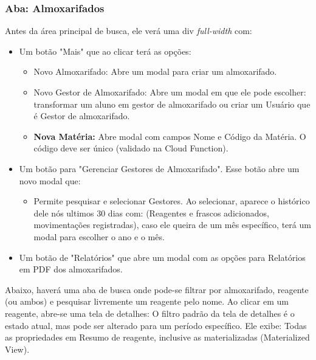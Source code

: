 \documentclass[12pt,a4paper]{article}
\begin{document}
\subsubsection{Aba: Almoxarifados}
Antes da área principal de busca, ele verá uma div \textit{full-width} com:
\begin{itemize}
    \item Um botão "Mais" que ao clicar terá as opções:
     \begin{itemize}
         \item Novo Almoxarifado: Abre um modal para criar um almoxarifado.
         \item Novo Gestor de Almoxarifado: Abre um modal em que ele pode escolher: transformar um aluno em gestor de almoxarifado ou criar um Usuário que é Gestor de almoxarifado.
         \item \textbf{Nova Matéria:} Abre modal com campos Nome e Código da Matéria. O código deve ser único (validado na Cloud Function).
     \end{itemize}
    \item Um botão para "Gerenciar Gestores de Almoxarifado". Esse botão abre um novo modal que:
    \begin{itemize}
        \item Permite pesquisar e selecionar Gestores. Ao selecionar, aparece o histórico dele nós ultimos 30 dias com: (Reagentes e frascos adicionados, movimentações registradas), caso ele queira de um mês específico, terá um modal para escolher o ano e o mês. 
    \end{itemize}
    \item Um botão de "Relatórios" que abre um modal com as opções para Relatórios em PDF dos almoxarifados.
\end{itemize} 
Abaixo, haverá uma aba de busca onde pode-se filtrar por almoxarifado, reagente (ou ambos) e pesquisar livremente um reagente pelo nome. Ao clicar em um reagente, abre-se uma tela de detalhes:
O filtro padrão da tela de detalhes é o estado atual, mas pode ser alterado para um período específico. Ele exibe: Todas as propriedades em Resumo de reagente, inclusive as materializadas (Materialized View).
\end{document}
